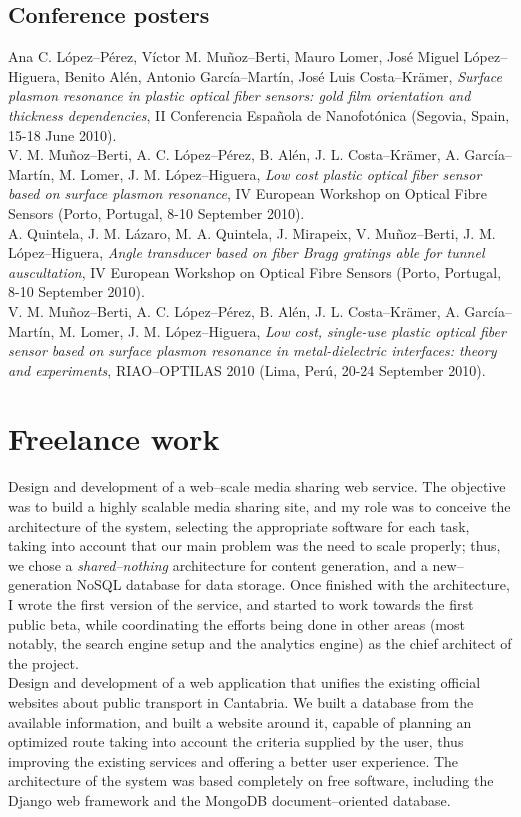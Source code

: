 \documentclass[11pt, a4paper]{article}
\newcommand{\years}[1]{\marginnote{\scriptsize #1}}
\begin{document}
\subsection*{Conference posters}
\noindent
\years{2010}Ana C. López--Pérez, Víctor M. Muñoz--Berti, Mauro Lomer, José Miguel López--Higuera, Benito Alén, Antonio García--Martín, José Luis Costa--Krämer, \textit{Surface plasmon resonance in plastic optical fiber sensors: gold film orientation and thickness dependencies}, II Conferencia Española de Nanofotónica (Segovia, Spain, 15-18 June 2010).\\
\years{2010}V. M. Muñoz--Berti, A. C. López--Pérez, B. Alén, J. L. Costa--Krämer, A. García--Martín, M. Lomer, J. M. López--Higuera, \textit{Low cost plastic optical fiber sensor based on surface plasmon resonance}, IV European Workshop on Optical Fibre Sensors (Porto, Portugal, 8-10 September 2010).\\
\years{2010}A. Quintela, J. M. Lázaro, M. A. Quintela, J. Mirapeix, V. Muñoz--Berti, J. M. López--Hi\-gue\-ra, \textit{Angle transducer based on fiber Bragg gratings able for tunnel auscultation}, IV European Workshop on Optical Fibre Sensors (Porto, Portugal, 8-10 September 2010).\\
\years{2010}V. M. Muñoz--Berti, A. C. López--Pérez, B. Alén, J. L. Costa--Krämer, A. García--Martín, M. Lomer, J. M. López--Higuera, \textit{Low cost, single-use plastic optical fiber sensor based on surface plasmon resonance in metal-dielectric interfaces: theory and experiments}, RIAO--OPTILAS 2010 (Lima, Perú, 20-24 September 2010).


\section*{Freelance work} %
\noindent
\years{2010--present}Design and development of a web--scale media sharing web service. The objective was to build a highly scalable media sharing site, and my role was to conceive the architecture of the system, selecting the appropriate software for each task, taking into account that our main problem was the need to scale properly; thus, we chose a \textit{shared--nothing} architecture for content generation, and a new--generation NoSQL database for data storage. Once finished with the architecture, I wrote the first version of the service, and started to work towards the first public beta, while coordinating the efforts being done in other areas (most notably, the search engine setup and the analytics engine) as the chief architect of the project.\\
\years{2011}Design and development of a web application that unifies the existing official websites about public transport in Cantabria. We built a database from the available information, and built a website around it, capable of planning an optimized route taking into account the criteria supplied by the user, thus improving the existing services and offering a better user experience. The architecture of the system was based completely on free software, including the Django web framework and the MongoDB document--oriented database.
\end{document}
